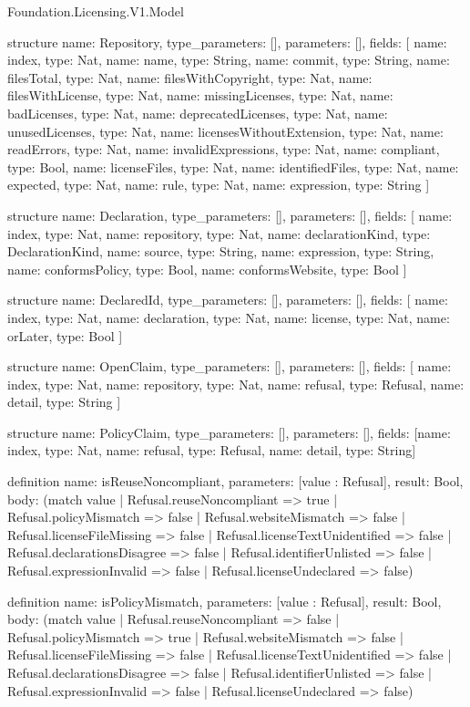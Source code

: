 \begin{lexlean}{Foundation.Licensing.V1.Model}
\begin{semanticmodule}
structure{
  name: Repository,
  type_parameters: [],
  parameters: [],
  fields: [
    {name: index, type: Nat},
    {name: name, type: String},
    {name: commit, type: String},
    {name: filesTotal, type: Nat},
    {name: filesWithCopyright, type: Nat},
    {name: filesWithLicense, type: Nat},
    {name: missingLicenses, type: Nat},
    {name: badLicenses, type: Nat},
    {name: deprecatedLicenses, type: Nat},
    {name: unusedLicenses, type: Nat},
    {name: licensesWithoutExtension, type: Nat},
    {name: readErrors, type: Nat},
    {name: invalidExpressions, type: Nat},
    {name: compliant, type: Bool},
    {name: licenseFiles, type: Nat},
    {name: identifiedFiles, type: Nat},
    {name: expected, type: Nat},
    {name: rule, type: Nat},
    {name: expression, type: String}
  ]
}

structure{
  name: Declaration,
  type_parameters: [],
  parameters: [],
  fields: [
    {name: index, type: Nat},
    {name: repository, type: Nat},
    {name: declarationKind, type: DeclarationKind},
    {name: source, type: String},
    {name: expression, type: String},
    {name: conformsPolicy, type: Bool},
    {name: conformsWebsite, type: Bool}
  ]
}

structure{
  name: DeclaredId,
  type_parameters: [],
  parameters: [],
  fields: [
    {name: index, type: Nat},
    {name: declaration, type: Nat},
    {name: license, type: Nat},
    {name: orLater, type: Bool}
  ]
}

structure{
  name: OpenClaim,
  type_parameters: [],
  parameters: [],
  fields: [
    {name: index, type: Nat},
    {name: repository, type: Nat},
    {name: refusal, type: Refusal},
    {name: detail, type: String}
  ]
}

structure{
  name: PolicyClaim,
  type_parameters: [],
  parameters: [],
  fields: [{name: index, type: Nat}, {name: refusal, type: Refusal}, {name: detail, type: String}]
}

definition{
  name: isReuseNoncompliant,
  parameters: [value : Refusal],
  result: Bool,
  body: (match value
    | Refusal.reuseNoncompliant => true
    | Refusal.policyMismatch => false
    | Refusal.websiteMismatch => false
    | Refusal.licenseFileMissing => false
    | Refusal.licenseTextUnidentified => false
    | Refusal.declarationsDisagree => false
    | Refusal.identifierUnlisted => false
    | Refusal.expressionInvalid => false
    | Refusal.licenseUndeclared => false)
}

definition{
  name: isPolicyMismatch,
  parameters: [value : Refusal],
  result: Bool,
  body: (match value
    | Refusal.reuseNoncompliant => false
    | Refusal.policyMismatch => true
    | Refusal.websiteMismatch => false
    | Refusal.licenseFileMissing => false
    | Refusal.licenseTextUnidentified => false
    | Refusal.declarationsDisagree => false
    | Refusal.identifierUnlisted => false
    | Refusal.expressionInvalid => false
    | Refusal.licenseUndeclared => false)
}


\end{semanticmodule}
\end{lexlean}
